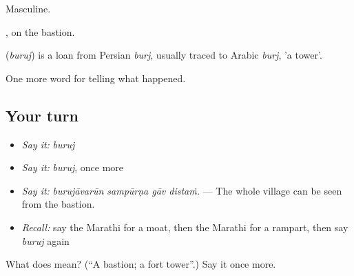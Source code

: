 Masculine.

, on the bastion.

\begin{cousinweb}
\textbf{} (\emph{buruj}) is a loan from Persian \emph{burj}, usually traced to Arabic \emph{burj}, 'a tower'.
\end{cousinweb}

\begin{grammarlens}[title={What you've built}]
One more word for telling what happened.
\end{grammarlens}

\subsection*{Your turn}
\begin{itemize}
\raggedright
  \item \emph{Say it:} \emph{buruj}
  \item \emph{Say it:} \emph{buruj}, once more
  \item \emph{Say it:} \emph{burujāvarūn sampūrṇa gāv distaṁ.} — The whole village can be seen from the bastion.
  \item \emph{Recall:} say the Marathi for a moat, then the Marathi for a rampart, then say \emph{buruj} again
\end{itemize}

\begin{tcolorbox}[breakable,colback=teal!4,colframe=teal!35!black,title={Before you move on}]
What does  mean? (\textquotedblleft{}A bastion; a fort tower\textquotedblright{}.) Say it once more.
\end{tcolorbox}
